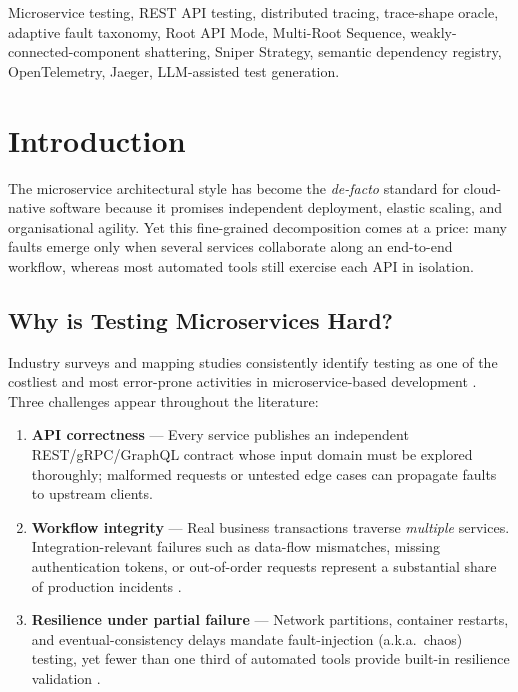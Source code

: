 \documentclass[conference]{IEEEtran}
\begin{document}
\begin{IEEEkeywords}
Microservice testing, REST API testing, distributed tracing, trace-shape oracle, adaptive fault taxonomy, Root API Mode, Multi-Root Sequence, weakly-connected-component shattering, Sniper Strategy, semantic dependency registry, OpenTelemetry, Jaeger, LLM-assisted test generation.
\end{IEEEkeywords}

\section{Introduction}
The microservice architectural style has become the \emph{de-facto}
standard for cloud-native software because it promises independent
deployment, elastic scaling, and organisational agility.  Yet this
fine-grained decomposition comes at a price: many faults emerge only
when several services collaborate along an end-to-end workflow, whereas
most automated tools still exercise each API in isolation.

\subsection*{Why is Testing Microservices Hard?}
Industry surveys and mapping studies consistently identify testing as
one of the costliest and most error-prone activities in
microservice-based development
\cite{waseem2020testing,miao2025sms}.  
Three challenges appear throughout the literature:

\begin{enumerate}[leftmargin=*,label=\roman*)]
  \item \textbf{API correctness} — Every service publishes an
        independent REST/gRPC/GraphQL contract whose input domain must be
        explored thoroughly; malformed requests or untested edge cases
        can propagate faults to upstream clients.
  \item \textbf{Workflow integrity} — Real business transactions
        traverse \emph{multiple} services.  
        Integration-relevant failures such as data-flow mismatches,
        missing authentication tokens, or out-of-order requests
        represent a substantial share of production incidents
        \cite{zhou2018microservice}.
  \item \textbf{Resilience under partial failure} — Network partitions,
        container restarts, and eventual-consistency delays mandate
        fault-injection (a.k.a.\ chaos) testing, yet fewer than one
        third of automated tools provide built-in resilience validation
        \cite{waseem2020testing}.
\end{enumerate}
\end{document}
